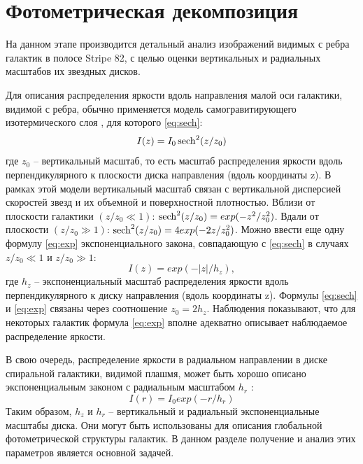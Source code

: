 \section{Фотометрическая декомпозиция}
На данном этапе производится детальный анализ изображений видимых с ребра галактик в полосе Stripe 82, с целью оценки вертикальных и радиальных масштабов их звездных дисков.

Для описания распределения яркости вдоль направления малой оси галактики, видимой с ребра, обычно применяется модель самогравитирующего изотермического слоя \cite{1981A&A....95..105V}, для которого \ref{eq:sech}:
\begin{equation}
I(z) = I_0\operatorname{sech}^2(z/z_0)
\label{eq:sech}
\end{equation}
где $z_0$ -- вертикальный масштаб, то есть масштаб распределения яркости вдоль перпендикулярного к плоскости диска направления (вдоль координаты z). В рамках этой модели вертикальный масштаб связан с вертикальной
дисперсией скоростей звезд и их объемной и поверхностной плотностью. 
Вблизи от плоскости галактики $(z/z_0 \ll 1)$: $\operatorname{sech}^2(z/z_0) = exp(-z^2/z_0^2)$.
Вдали от плоскости $(z/z_0 \gg 1)$: $\operatorname{sech}^2(z/z_0) = 4exp(-2z/z_0^2) $.
Можно ввести еще одну формулу \ref{eq:exp} экспоненциального закона, совпадающую с \ref{eq:sech} в случаях $z/z_0 \ll 1$ и $z/z_0 \gg 1$:
\begin{equation}
    I(z) = exp(-|z|/h_z),
    \label{eq:exp}
\end{equation}
где $h_z$ -- экспоненциальный масштаб распределения яркости вдоль перпендикулярного к диску направления (вдоль координаты z). Формулы \ref{eq:sech} и \ref{eq:exp} связаны через соотношение $z_0 = 2h_z$.
Наблюдения показывают, что для некоторых галактик формула \ref{eq:exp} вполне адекватно описывает наблюдаемое распределение яркости. 

В свою очередь, распределение яркости в радиальном направлении в диске спиральной галактики, видимой плашмя, может быть хорошо описано экспоненциальным законом с радиальным масштабом $h_r$ \cite{1959HDP....53..275D} \cite{1940BHarO.914....9P}:
\begin{equation}
    I(r) = I_0exp(-r/h_r)
    \label{eq:radexp}
\end{equation}
Таким образом, $h_z$ и $h_r$ – вертикальный и радиальный экспоненциальные масштабы диска. Они могут быть использованы для описания глобальной фотометрической структуры галактик. В данном разделе получение и анализ этих параметров является основной задачей. 


